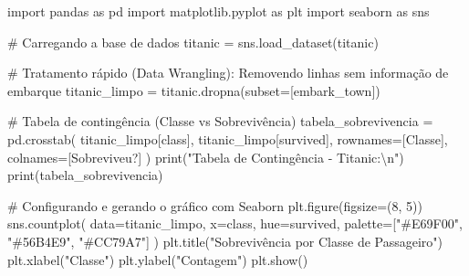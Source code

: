 \documentclass[
  brazilian,
  letterpaper,
  DIV=11,
  numbers=noendperiod]{scrreprt}
\newenvironment{Shaded}{\begin{snugshade}}{\end{snugshade}}
\newcommand{\BuiltInTok}[1]{\textcolor[rgb]{0.00,0.23,0.31}{#1}}
\newcommand{\CharTok}[1]{\textcolor[rgb]{0.13,0.47,0.30}{#1}}
\newcommand{\CommentTok}[1]{\textcolor[rgb]{0.37,0.37,0.37}{#1}}
\newcommand{\DecValTok}[1]{\textcolor[rgb]{0.68,0.00,0.00}{#1}}
\newcommand{\ImportTok}[1]{\textcolor[rgb]{0.00,0.46,0.62}{#1}}
\newcommand{\NormalTok}[1]{\textcolor[rgb]{0.00,0.23,0.31}{#1}}
\newcommand{\OperatorTok}[1]{\textcolor[rgb]{0.37,0.37,0.37}{#1}}
\newcommand{\StringTok}[1]{\textcolor[rgb]{0.13,0.47,0.30}{#1}}
\begin{document}
\begin{Shaded}
\begin{Highlighting}[]
\ImportTok{import}\NormalTok{ pandas }\ImportTok{as}\NormalTok{ pd}
\ImportTok{import}\NormalTok{ matplotlib.pyplot }\ImportTok{as}\NormalTok{ plt}
\ImportTok{import}\NormalTok{ seaborn }\ImportTok{as}\NormalTok{ sns}

\CommentTok{\# Carregando a base de dados}
\NormalTok{titanic }\OperatorTok{=}\NormalTok{ sns.load\_dataset(}\StringTok{\textquotesingle{}titanic\textquotesingle{}}\NormalTok{)}

\CommentTok{\# Tratamento rápido (Data Wrangling): Removendo linhas sem informação de embarque}
\NormalTok{titanic\_limpo }\OperatorTok{=}\NormalTok{ titanic.dropna(subset}\OperatorTok{=}\NormalTok{[}\StringTok{\textquotesingle{}embark\_town\textquotesingle{}}\NormalTok{])}

\CommentTok{\# Tabela de contingência (Classe vs Sobrevivência)}
\NormalTok{tabela\_sobrevivencia }\OperatorTok{=}\NormalTok{ pd.crosstab(}
\NormalTok{    titanic\_limpo[}\StringTok{\textquotesingle{}class\textquotesingle{}}\NormalTok{], }
\NormalTok{    titanic\_limpo[}\StringTok{\textquotesingle{}survived\textquotesingle{}}\NormalTok{], }
\NormalTok{    rownames}\OperatorTok{=}\NormalTok{[}\StringTok{\textquotesingle{}Classe\textquotesingle{}}\NormalTok{], }
\NormalTok{    colnames}\OperatorTok{=}\NormalTok{[}\StringTok{\textquotesingle{}Sobreviveu?\textquotesingle{}}\NormalTok{]}
\NormalTok{)}
\BuiltInTok{print}\NormalTok{(}\StringTok{"Tabela de Contingência {-} Titanic:}\CharTok{\textbackslash{}n}\StringTok{"}\NormalTok{)}
\BuiltInTok{print}\NormalTok{(tabela\_sobrevivencia)}

\CommentTok{\# Configurando e gerando o gráfico com Seaborn}
\NormalTok{plt.figure(figsize}\OperatorTok{=}\NormalTok{(}\DecValTok{8}\NormalTok{, }\DecValTok{5}\NormalTok{))}
\NormalTok{sns.countplot(}
\NormalTok{    data}\OperatorTok{=}\NormalTok{titanic\_limpo, }
\NormalTok{    x}\OperatorTok{=}\StringTok{\textquotesingle{}class\textquotesingle{}}\NormalTok{, }
\NormalTok{    hue}\OperatorTok{=}\StringTok{\textquotesingle{}survived\textquotesingle{}}\NormalTok{, }
\NormalTok{    palette}\OperatorTok{=}\NormalTok{[}\StringTok{"\#E69F00"}\NormalTok{, }\StringTok{"\#56B4E9"}\NormalTok{, }\StringTok{"\#CC79A7"}\NormalTok{]}
\NormalTok{)}
\NormalTok{plt.title(}\StringTok{"Sobrevivência por Classe de Passageiro"}\NormalTok{)}
\NormalTok{plt.xlabel(}\StringTok{"Classe"}\NormalTok{)}
\NormalTok{plt.ylabel(}\StringTok{"Contagem"}\NormalTok{)}
\NormalTok{plt.show()}
\end{Highlighting}
\end{Shaded}
\end{document}
